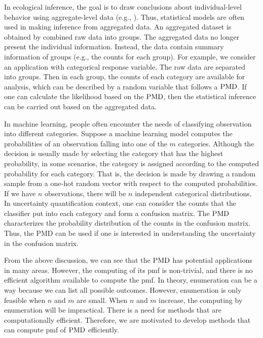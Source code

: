 \documentclass[12pt]{article}
\newcommand{\PMD}{{\normalfont\textrm{PMD}}}
\begin{document}
In ecological inference, the goal is to draw conclusions about individual-level behavior using aggregate-level data (e.g., ). Thus, statistical models are often used in making inference from aggregated data. An aggregated dataset is obtained by combined raw data into groups. The aggregated data no longer present the individual information. Instead, the data contain summary information of groups (e.g., the counts for each group). For example, we consider an application with categorical response variable. The raw data are separated into groups. Then in each group, the counts of each category are available for analysis, which can be described by a random variable that follows a $\PMD$. If one can calculate the likelihood based on the $\PMD$, then the statistical inference can be carried out based on the aggregated data.

In machine learning, people often encounter the needs of classifying observation into different categories. Suppose a machine learning model computes the probabilities of an observation falling into one of the $m$ categories. Although the decision is usually made by selecting the category that has the highest probability, in some scenarios, the category is assigned according to the computed probability for each category. That is, the decision is made by drawing a random sample from a one-hot random vector with respect to the computed probabilities. If we have $n$ observations, there will be $n$ independent categorical distributions. In uncertainty quantification context, one can consider the counts that the classifier put into each category and form a confusion matrix. The $\PMD$ characterizes the probability distribution of the counts in the confusion matrix. Thus, the PMD can be used if one is interested in understanding the uncertainty in the confusion matrix.

From the above discussion, we can see that the $\PMD$ has potential applications in many areas. However, the computing of its pmf is non-trivial, and there is no efficient algorithm available to compute the pmf. In theory, enumeration can be a way because we can list all possible outcomes.  However, enumeration is only feasible when $n$ and $m$ are small. When $n$ and $m$ increase, the computing by enumeration will be impractical. There is a need for methods that are computationally efficient.  Therefore, we are motivated to develop methods that can compute pmf of $\PMD$ efficiently.


\end{document}

